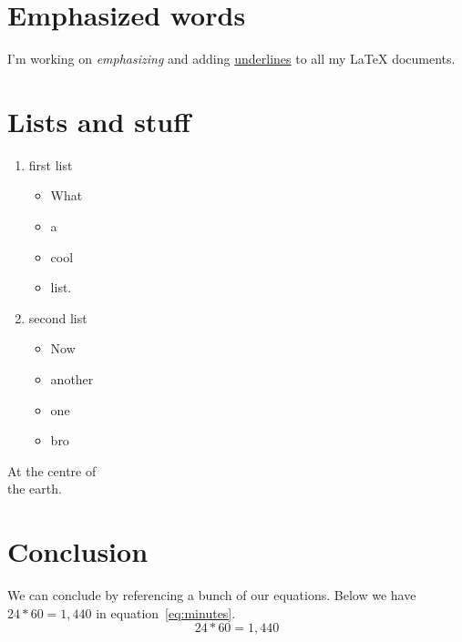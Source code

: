 \documentclass{article}
\begin{document}
\section{Emphasized words}
I'm working on \emph{emphasizing} and adding \underline{underlines} to all my \LaTeX{} documents.

\section{Lists and stuff}
\begin{enumerate}
\item first list
\begin{itemize}
\item What 
\item a 
\item cool
\item list.  
\end{itemize}
\item second list
\begin{itemize}
\item Now 
\item another
\item one
\item bro 
\end{itemize}
\end{enumerate}

\begin{center}
At the centre of \\ the earth.
\end{center}


\section{Conclusion}
We can conclude by referencing a bunch of our equations. Below we have $24 * 60 = 1,440$ in equation~\ref{eq:minutes}.
\begin{equation}
24 * 60 = 1,440 
\label{eq:minutes}
\end{equation}
\end{document}
